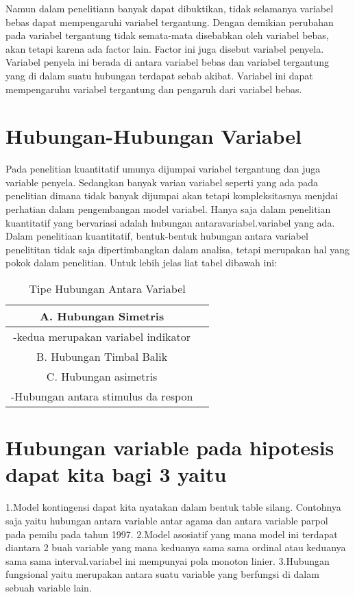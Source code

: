 Namun dalam penelitiann banyak dapat dibuktikan, tidak selamanya variabel bebas dapat mempengaruhi variabel tergantung.
Dengan demikian perubahan pada variabel tergantung tidak semata-mata disebabkan oleh variabel bebas, akan tetapi karena ada factor lain. 
Factor ini juga disebut variabel penyela. Variabel penyela ini berada di antara variabel bebas dan variabel tergantung yang di dalam 
suatu hubungan terdapat sebab akibat. Variabel ini dapat mempengaruhu variabel tergantung  dan pengaruh dari variabel bebas.

\section{Hubungan-Hubungan Variabel}
Pada penelitian kuantitatif umunya dijumpai variabel tergantung dan juga variable penyela. Sedangkan banyak varian variabel seperti yang 
ada pada penelitian dimana tidak banyak dijumpai akan tetapi kompleksitasnya menjdai perhatian dalam pengembangan model variabel. Hanya 
saja dalam penelitian kuantitatif yang bervariasi adalah hubungan antaravariabel.variabel yang ada. Dalam penelitiaan kuantitatif, 
bentuk-bentuk hubungan antara variabel penelititan tidak saja dipertimbangkan dalam analisa, tetapi merupakan hal yang pokok dalam 
penelitian. Untuk lebih jelas liat tabel dibawah ini:

\begin{table} [ht]
\caption{Tipe Hubungan Antara Variabel}
\centering
\begin {tabular} {|cc|}
\hline
A. Hubungan Simetris & \\
\hline
-kedua merupakan variabel indikator &\\
\hline
B. Hubungan Timbal Balik & \\
\hline
C. Hubungan asimetris & \\
\hline
-Hubungan antara stimulus da respon & \\
\hline
\end{tabular}
\label{ltabel}
\end{table} 

\section{Hubungan variable pada hipotesis dapat kita bagi 3 yaitu}
1.Model kontingensi dapat kita nyatakan dalam bentuk table silang. Contohnya saja yaitu hubungan antara variable antar agama dan antara 
variable parpol pada pemilu pada tahun 1997. 
2.Model asosiatif yang mana model ini terdapat diantara 2 buah variable yang mana keduanya sama sama ordinal atau keduanya sama sama 
interval.variabel ini mempunyai pola monoton linier.
3.Hubungan fungsional yaitu merupakan antara suatu variable yang berfungsi di dalam sebuah variable lain.

